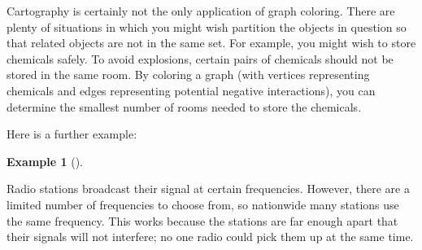 \documentclass[10pt,]{book}
\theoremstyle{plain}
\theoremstyle{definition}
\newtheorem{example}[theorem]{Example}
\theoremstyle{definition}
\theoremstyle{definition}
\numberwithin{equation}{chapter}
\begin{document}
Cartography is certainly not the only application of graph coloring. There are plenty of situations in which you might wish partition the objects in question so that related objects are not in the same set. For example, you might wish to store chemicals safely. To avoid explosions, certain pairs of chemicals should not be stored in the same room. By coloring a graph (with vertices representing chemicals and edges representing potential negative interactions), you can determine the smallest number of rooms needed to store the chemicals.
%
\par

Here is a further example:
%
\begin{example}[]\label{example-106}

Radio stations broadcast their signal at certain frequencies. However, there are a limited number of frequencies to choose from, so nationwide many stations use the same frequency. This works because the stations are far enough apart that their signals will not interfere; no one radio could pick them up at the same time.
%
\par


\end{example}
\end{document}
